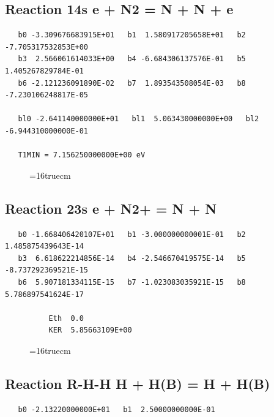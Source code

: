 \documentclass[12pt]{article}
\begin{document}
\subsection{
Reaction 14s e + N2 = N + N + e }
\begin{small}\begin{verbatim}
   b0 -3.309676683915E+01   b1  1.580917205658E+01   b2 -7.705317532853E+00
   b3  2.566061614033E+00   b4 -6.684306137576E-01   b5  1.405267829784E-01
   b6 -2.121236091890E-02   b7  1.893543508054E-03   b8 -7.230106248817E-05

   bl0 -2.641140000000E+01   bl1  5.063430000000E+00   bl2 -6.944310000000E-01

   T1MIN = 7.156250000000E+00 eV
\end{verbatim}\end{small}
\begin{figure}[h!] \label{n2rates}
\epsfxsize=16truecm
\end{figure}
\newpage

\subsection{
Reaction 23s e + N2+ = N + N }
\begin{small}\begin{verbatim}
   b0 -1.668406420107E+01   b1 -3.000000000001E-01   b2  1.485875439643E-14
   b3  6.618622214856E-14   b4 -2.546670419575E-14   b5 -8.737292369521E-15
   b6  5.907181334115E-15   b7 -1.023083035921E-15   b8  5.786897541624E-17

          Eth  0.0
          KER  5.85663109E+00

\end{verbatim}\end{small}
\begin{figure}[h!] \label{n2rates}
\epsfxsize=16truecm
\end{figure}
\newpage

\subsection{
Reaction R-H-H H + H(B) = H + H(B) }
\begin{small}\begin{verbatim}
   b0 -2.13220000000E+01   b1  2.50000000000E-01
\end{verbatim}\end{small}
\newpage
\end{document}
